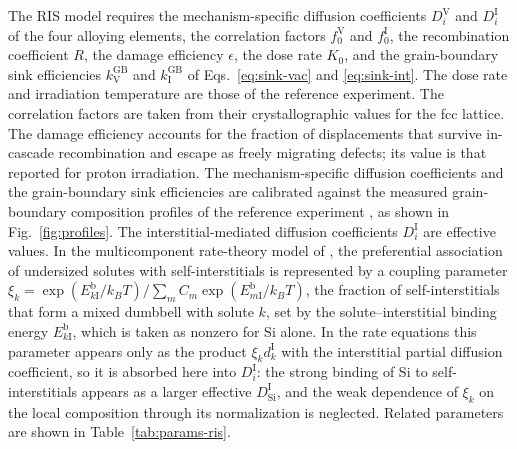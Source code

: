 \documentclass[3p,times,nonatbib]{elsarticle} %
\newcommand{\Vac}{\mathrm{V}}          %
\newcommand{\Int}{\mathrm{I}}          %
\newcommand{\GB}{\mathrm{GB}}
\begin{document}
The RIS model requires the mechanism-specific diffusion coefficients
\(D_i^{\Vac}\) and \(D_i^{\Int}\) of the four alloying elements, the correlation
factors \(f_0^{\Vac}\) and \(f_0^{\Int}\), the recombination coefficient \(R\),
the damage efficiency \(\epsilon\), the dose rate \(K_0\), and the grain-boundary
sink efficiencies \(k_{\Vac}^{\GB}\) and \(k_{\Int}^{\GB}\) of
Eqs.~\eqref{eq:sink-vac} and \eqref{eq:sink-int}. The dose rate and
irradiation temperature are those of the reference experiment. The correlation
factors are taken from their crystallographic values for the fcc lattice. The
damage efficiency accounts for the fraction of displacements that survive
in-cascade recombination and escape as freely migrating defects; its value is
that reported for proton irradiation. The mechanism-specific diffusion
coefficients and the grain-boundary sink efficiencies are calibrated against the measured grain-boundary composition
profiles of the reference experiment \cite{deng2021grain}, as shown in Fig.~\ref{fig:profiles}. The interstitial-mediated diffusion coefficients \(D_i^{\Int}\) are effective
values. In the multicomponent rate-theory model of
\textcite{fukuya2009multicomponent}, the preferential association of
undersized solutes with self-interstitials is represented by a coupling
parameter
\(\xi_k=\exp(E^{\mathrm{b}}_{k\Int}/k_BT)\big/\sum_m C_m\exp(E^{\mathrm{b}}_{m\Int}/k_BT)\),
the fraction of self-interstitials that form a mixed dumbbell with solute
\(k\), set by the solute--interstitial binding energy
\(E^{\mathrm{b}}_{k\Int}\), which is taken as nonzero for Si alone. In the
rate equations this parameter appears only as the product
\(\xi_k d_k^{\Int}\) with the interstitial partial diffusion coefficient, so
it is absorbed here into \(D_i^{\Int}\): the strong binding of Si to
self-interstitials appears as a larger effective \(D_{\mathrm{Si}}^{\Int}\),
and the weak dependence of \(\xi_k\) on the local composition through its
normalization is neglected. Related parameters are shown in Table~\ref{tab:params-ris}.
\end{document}
